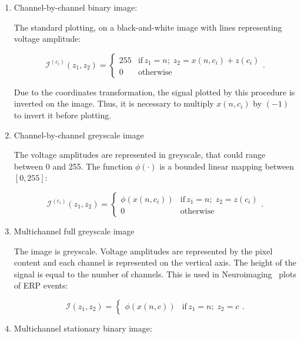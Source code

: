 \begin{enumerate}
\item Channel-by-channel binary image:

The standard plotting, on a black-and-white image with lines representing voltage amplitude:

\begin{equation}
\mathcal{I}^{(c_i)}(z_1,z_2)= \left\{ \begin{array}{rl}
255 & \text{if} \,  z_1 =  n; \; z_2 = x(n,c_i) + z(c_i) \\
0   & \mbox{otherwise}
\end{array}\right    ..
\label{eq:image1}
\end{equation}

Due to the coordinates transformation, the signal plotted by this procedure is inverted on the image.  Thus, it is necessary to multiply $x(n,c_i)$ by $(-1)$ to invert it before plotting.

\item Channel-by-channel greyscale image

The voltage amplitudes are represented in greyscale, that could range between 0 and 255.  The function $\phi( \cdot )$ is a bounded linear mapping between $\left[ 0,255 \right]$:

\begin{equation}
\mathcal{I}^{(c_i)}(z_1,z_2)= \left\{ \begin{array}{rl}
\phi(x(n,c_i)) & \text{if} \,  z_1 = n; \; z_2 = z(c_i) \\
0   & \mbox{otherwise}
\end{array}\right ..
\label{eq:image2}
\end{equation}

\item Multichannel full greyscale image

The image is greyscale. Voltage amplitudes are represented by the pixel content and each channel is represented on the vertical axis.  The height of the signal is equal to the number of channels.   This is used in Neuroimaging~\cite{Freeman2013} plots of ERP events:

\begin{equation}
\mathcal{I}(z_1,z_2) = \left\{ \begin{array}{rl} \phi(x(n,c))  & \text{if} \,  z_1 = n; \; z_2 = c \end{array}\right. .
\label{eq:image3}
\end{equation}


\item Multichannel stationary binary image:


\end{enumerate}

